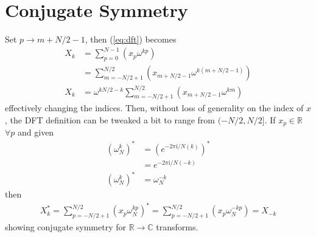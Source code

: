 \documentclass{article}
\begin{document}
\section {Conjugate Symmetry}
%
Set $p \rightarrow m + N/2 - 1$, then (\ref{eq:dft}) becomes
%
\begin {equation}
\begin {aligned}
X_k &= \sum_{p = 0}^{N-1} (x_p \omega^{k p}) \\
    &= \sum_{m = -N/2 + 1}^{N/2} (x_{m + N/2 - 1} \omega^{k (m + N/2 - 1)}) \\
X_k &= \omega^{k N/2 - k} \sum_{m = -N/2 + 1}^{N/2} (x_{m + N/2 - 1} \omega^{k m})
\end {aligned}
\end {equation}
%
effectively changing the indices.
Then, without loss of generality on the index of $x$, the DFT definition can be tweaked a bit to range from $(-N/2, N/2]$.
If $x_p \in \mathbb {R}$ $\forall p$ and given
%
\begin {equation}
\begin {aligned}
\left (\omega_N^{k} \right)^* &= \left (e^{-2 \pi \mathrm {i} / N (k)} \right)^* \\
                              &= e^{-2 \pi \mathrm {i} / N (-k)} \\
\left (\omega_N^{k} \right)^* &= \omega_{N}^{-k}
\end {aligned}
\end {equation}
%
then
%
\begin {equation}
\begin {aligned}
X_k^* = \sum_{p = -N/2+1}^{N/2} (x_p \omega_N^{k p})^*
      = \sum_{p = -N/2+1}^{N/2} (x_p \omega_N^{-k p})
      = X_{-k}
\end {aligned}
\end {equation}
%
showing conjugate symmetry for $\mathbb{R} \rightarrow \mathbb{C}$ transforms.
%
\end{document}
